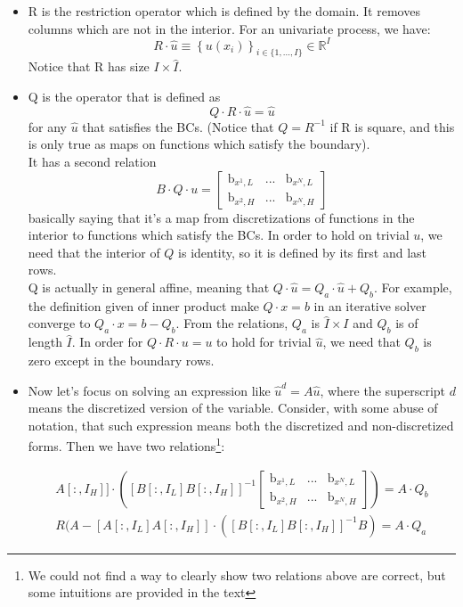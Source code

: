 \documentclass[11pt]{article}
\newcommand{\set}[1]{\ensuremath{\left\{{#1}\right\}}}
\newcommand{\R}{\ensuremath{\mathbb{R}}}
\begin{document}
\begin{itemize}
		\item R is the restriction operator which is defined by the domain. It removes columns which are not in the interior. 
		For an univariate process, we have:
		\begin{equation}
		R\cdot \hat{u}  \equiv\set{u(x_i)}_{i \in \{1,...,I\}} \in \R^{I} \label{R_operator}
		\end{equation}
		Notice that R has size $I \times \hat{I}$.
		\item Q is the operator that is defined as
		\begin{equation}
		Q \cdot R\cdot\hat{u} = \hat{u}\label{Q_operator_1}
		\end{equation}
		for any $\hat{u}$ that satisfies the BCs. (Notice that $Q = R^{-1}$ if R is square, and this is only true as maps on functions which satisfy the boundary).\\
		It has a second relation 
		\begin{equation}
		B\cdot Q\cdot u  = \begin{bmatrix}
		\text{b}_{x^{1},L} & ... & \text{b}_{x^{N},L}\\
		\text{b}_{x^{2},H} & ... & \text{b}_{x^{N},H}
		\end{bmatrix}\label{Q_operator_2}
		\end{equation}
		basically saying that it's a map from discretizations of functions in the interior to functions which satisfy the BCs. In order to hold on trivial $u$, we need that the interior of $Q$ is identity, so it is defined by its first and last rows.\\
		Q is actually in general affine, meaning that $Q\cdot \hat{u} = Q_a\cdot \hat{u} + Q_b$. For example, the definition given of inner product make $Q\cdot x=b$ in an iterative solver converge to $Q_a\cdot x = b - Q_b$. From the relations, $Q_a$ is $\hat{I}\times I$ and $Q_b$ is of length $\hat{I}$. In order for $Q\cdot R\cdot u = u$ to hold for trivial $\hat{u}$, we need that $Q_b$ is zero except in the boundary rows.
		
		\item Now let's focus on solving an expression like $\hat{u}^d = A \hat{u}$, where the superscript $d$ means the discretized version of the variable. Consider, with some abuse of notation, that such expression means both the discretized and non-discretized forms. Then we have two relations\footnote{We could not find a way to clearly show two relations above are correct, but some intuitions are provided in the text}:
		
		\begin{align}
		[A[:, I_L] A[:, I_H]]\cdot\left([B[:, I_L] B[:, I_H]]^{-1}\begin{bmatrix}
		\text{b}_{x^{1},L} & ... & \text{b}_{x^{N},L}\\
		\text{b}_{x^{2},H} & ... & \text{b}_{x^{N},H}
		\end{bmatrix}\right) = A\cdot Q_b\label{affine_relation_1}\\
		R(A-[A[:, I_L] A[:, I_H]]\cdot([B[:, I_L] B[:, I_H]]^{-1} B) = A\cdot Q_a\label{affine_relation_2}
		\end{align}
		

\end{itemize}
\end{document}

